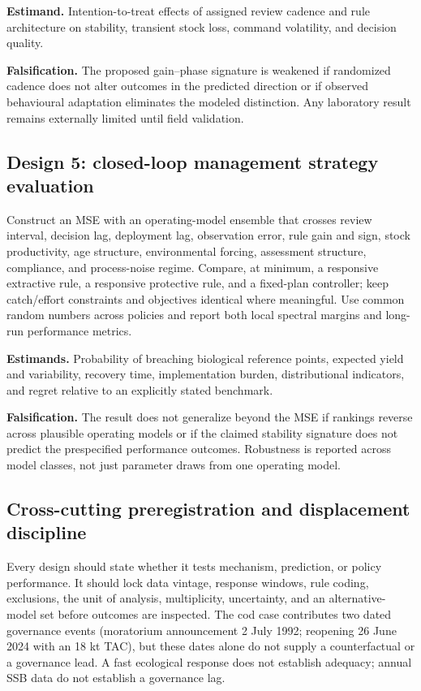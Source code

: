 \textbf{Estimand.} Intention-to-treat effects of assigned review cadence and rule architecture on stability, transient stock loss, command volatility, and decision quality.

\textbf{Falsification.} The proposed gain--phase signature is weakened if randomized cadence does not alter outcomes in the predicted direction or if observed behavioural adaptation eliminates the modeled distinction. Any laboratory result remains externally limited until field validation.

\subsection{Design 5: closed-loop management strategy evaluation}

Construct an MSE with an operating-model ensemble that crosses review interval, decision lag, deployment lag, observation error, rule gain and sign, stock productivity, age structure, environmental forcing, assessment structure, compliance, and process-noise regime. Compare, at minimum, a responsive extractive rule, a responsive protective rule, and a fixed-plan controller; keep catch/effort constraints and objectives identical where meaningful. Use common random numbers across policies and report both local spectral margins and long-run performance metrics.

\textbf{Estimands.} Probability of breaching biological reference points, expected yield and variability, recovery time, implementation burden, distributional indicators, and regret relative to an explicitly stated benchmark.

\textbf{Falsification.} The result does not generalize beyond the MSE if rankings reverse across plausible operating models or if the claimed stability signature does not predict the prespecified performance outcomes. Robustness is reported across model classes, not just parameter draws from one operating model.

\subsection{Cross-cutting preregistration and displacement discipline}

Every design should state whether it tests mechanism, prediction, or policy performance. It should lock data vintage, response windows, rule coding, exclusions, the unit of analysis, multiplicity, uncertainty, and an alternative-model set before outcomes are inspected. The cod case contributes two dated governance events (moratorium announcement 2 July 1992; reopening 26 June 2024 with an 18 kt TAC), but these dates alone do not supply a counterfactual or a governance lead. A fast ecological response does not establish adequacy; annual SSB data do not establish a governance lag.

